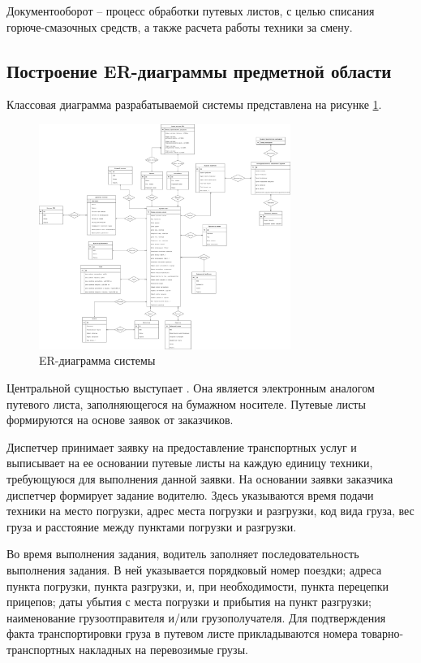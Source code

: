 \documentclass[../nirs.tex]{subfiles}
\begin{document}
Документооборот -- процесс обработки путевых листов, с целью списания
горюче-смазочных средств, а также расчета работы техники за смену.

\subsection{Построение ER-диаграммы предметной области}
Классовая диаграмма разрабатываемой системы представлена на рисунке
\ref{fig:2_1_3_er_diagram}.

\begin{figure}
	\centering
	\includegraphics[keepaspectratio,width=0.73\textwidth]{./images/2_1_3_er-diagram.png}
	\caption{ER-диаграмма системы}
	\label{fig:2_1_3_er_diagram}
\end{figure}

Центральной сущностью выступает . Она является
электронным аналогом путевого листа, заполняющегося на бумажном носителе.
Путевые листы формируются на основе заявок от заказчиков.

Диспетчер принимает заявку на предоставление транспортных услуг и выписывает на
ее основании путевые листы на каждую единицу техники, требующуюся для выполнения
данной заявки. На основании заявки заказчика диспетчер формирует задание
водителю. Здесь указываются время подачи техники на место погрузки, адрес места
погрузки и разгрузки, код вида груза, вес груза и расстояние между пунктами
погрузки и разгрузки.

Во время выполнения задания, водитель заполняет последовательность выполнения
задания. В ней указывается порядковый номер поездки; адреса пункта погрузки,
пункта разгрузки, и, при необходимости, пункта перецепки прицепов; даты убытия с
места погрузки и прибытия на пункт разгрузки; наименование грузоотправителя
и/или грузополучателя. Для подтверждения факта транспортировки груза в путевом
листе прикладываются номера товарно-транспортных накладных на перевозимые грузы.
\end{document}
